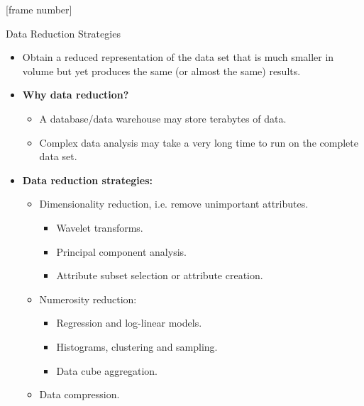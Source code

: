 \documentclass[aspectratio=169,t]{beamer}
\begin{document}
  {
    [frame number]
    \begin{frame}{Data Reduction Strategies}
        \begin{itemize}
            \item Obtain a reduced representation of the data set that is much smaller in volume but yet produces the same (or almost the same)  results.
            \item \textbf{Why data reduction?}\\
            \begin{itemize}
              \item A database/data warehouse may store terabytes of data.
              \item Complex data analysis may take a very long time to run on the complete data set.
            \end{itemize}
            \item \textbf{Data reduction strategies:}
            \begin{itemize}
              \item Dimensionality reduction, i.e. remove unimportant attributes.
              \begin{itemize}
                \item Wavelet transforms.
                \item Principal component analysis.
                \item Attribute subset selection or attribute creation.
              \end{itemize}
              \item Numerosity reduction:
              \begin{itemize}
                \item Regression and log-linear models.
                \item Histograms, clustering and sampling.
                \item Data cube aggregation.
              \end{itemize}
              \item Data compression.
            \end{itemize}
        \end{itemize}
    \end{frame}
  }
\end{document}
